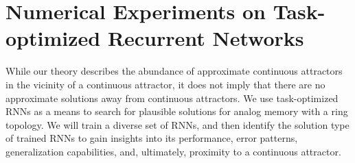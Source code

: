 \documentclass{article} %
\newcommand{\mpcomment}[1]{\textcolor{mpcolor}{(#1)}}
\newcounter{ct}
\theoremstyle{definition}
\theoremstyle{remark}
\begin{document}




\section{Numerical Experiments on Task-optimized Recurrent Networks}\label{sec:experiments}

While our theory describes the abundance of approximate continuous attractors in the vicinity of a continuous attractor, it does not imply that there are no approximate solutions away from continuous attractors.
We use task-optimized RNNs as a means to search for plausible solutions for analog memory with a ring topology.
We will train a diverse set of RNNs, and then identify the solution type of trained RNNs to gain insights into its performance, error patterns, generalization capabilities, and, ultimately, proximity to a continuous attractor.
\end{document}
